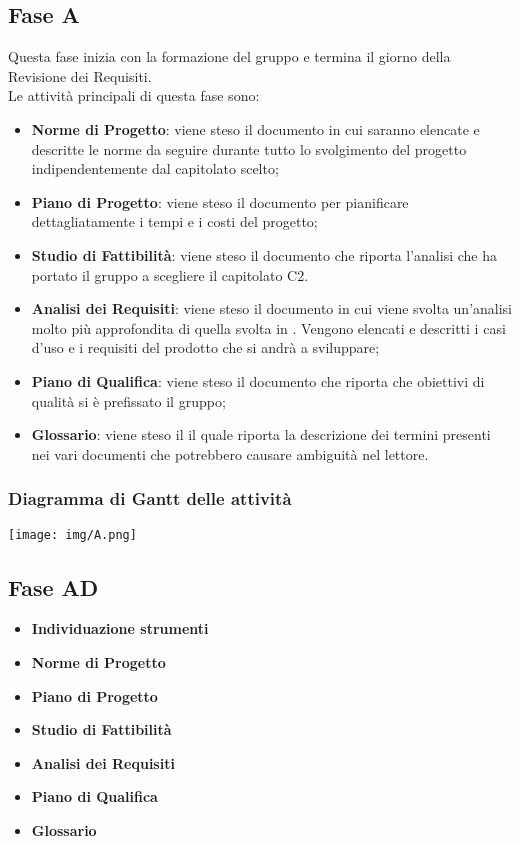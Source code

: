 	\subsection{Fase A}
	Questa fase inizia con la formazione del gruppo e termina il giorno della Revisione dei Requisiti. \\
	Le attività principali di questa fase sono: 
		\begin{itemize}
			\item \textbf{Norme di Progetto}: viene steso il documento \NPdoc in cui saranno elencate e descritte le norme da seguire durante tutto lo svolgimento del progetto indipendentemente dal capitolato scelto;
			\item \textbf{Piano di Progetto}: viene steso il documento \PPdoc per pianificare dettagliatamente i tempi e i costi del progetto;
			\item \textbf{Studio di Fattibilità}: viene steso il documento \SFdoc che riporta l'analisi che ha portato il gruppo a scegliere il capitolato C2.
			\item \textbf{Analisi dei Requisiti}: viene steso il documento \ARdoc in cui viene svolta un'analisi molto più approfondita di quella svolta in \SFdoc. Vengono elencati e descritti i casi d'uso e i requisiti del prodotto che si andrà a sviluppare;
			\item \textbf{Piano di Qualifica}: viene steso il documento \PQdoc che riporta che obiettivi di qualità si è prefissato il gruppo;
			\item \textbf{Glossario}: viene steso il \Gldoc il quale riporta la descrizione dei termini presenti nei vari documenti che potrebbero causare ambiguità nel lettore.
			
		\end{itemize}
		\subsubsection{Diagramma di Gantt delle attività}
		\texttt{[image: img/A.png]} 
		
		
	\subsection{Fase AD}
		\begin{itemize}
			\item \textbf{Individuazione strumenti} 
			\item \textbf{Norme di Progetto}
			\item \textbf{Piano di Progetto}
			\item \textbf{Studio di Fattibilità}
			\item \textbf{Analisi dei Requisiti}
			\item \textbf{Piano di Qualifica}
			\item \textbf{Glossario}
		\end{itemize}
